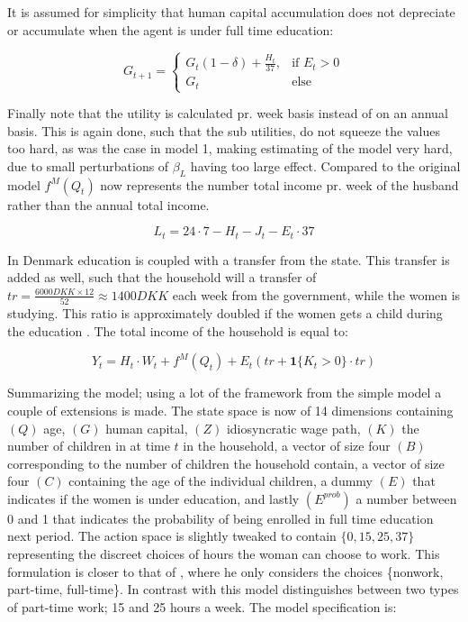 It is assumed for simplicity that human capital accumulation does not depreciate or accumulate when the agent is under full time education:

\begin{equation}
    G_{t+1} = 
    \begin{cases}
        G_t(1 - \delta) + \frac{H_t}{37}, & \text{if } E_t > 0 \\
        G_t & \text{else}
    \end{cases}
\end{equation}


Finally note that the utility is calculated pr. week basis instead of on an annual basis. This is again done, such that the sub utilities, do not squeeze the values too hard, as was the case in model 1, making estimating of the model very hard, due to small perturbations of $\beta_L$ having too large effect. Compared to the original model $f^M(Q_t)$ now represents the number total income pr. week of the husband rather than the annual total income.

\begin{equation}
    L_t = 24 \cdot 7 - H_t - J_t - E_t \cdot 37
\end{equation}

In Denmark education is coupled with a transfer from the state. This transfer is added as well, such that the household will a transfer of $tr = \frac{6000 DKK \times 12}{52} \approx 1400 DKK$ each week from the government, while the women is studying. This ratio is approximately doubled if the women gets a child during the education \parencite{noauthor_satser_nodate-1}. The total income of the household is equal to:

\begin{equation}
    Y_t = H_t \cdot W_t + f^M(Q_t) + E_t (tr + \mathbf{1} \{ K_t > 0 \} \cdot tr)  
\end{equation}


Summarizing the model; using a lot of the framework from the simple model a couple of extensions is made. The state space is now of 14 dimensions containing $(Q)$ age, $(G)$ human capital, $(Z)$ idiosyncratic wage path, $(K)$ the number of children in at time $t$ in the household, a vector of size four $(B)$ corresponding to the number of children the household contain, a vector of size four $(C)$ containing the age of the individual children, a dummy $(E)$ that indicates if the women is under education, and lastly $(E^{prob})$ a number between 0 and 1 that indicates the probability of being enrolled in full time education next period. The action space is slightly tweaked to contain $\{ 0, 15, 25, 37\}$ representing the discreet choices of hours the woman can choose to work. This formulation is closer to that of \textcite{francesconi_joint_2002}, where he only considers the choices \{nonwork, part-time, full-time\}. In contrast with \textcite{francesconi_joint_2002} this model distinguishes between two types of part-time work; 15 and 25 hours a week. The model specification is:

